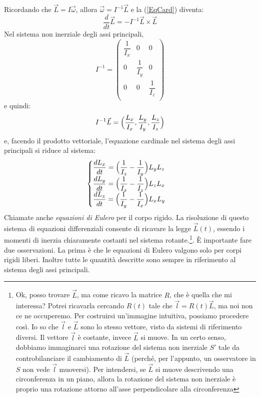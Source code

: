 \documentclass[a4paper,openany]{article}
\begin{document}
	
	Ricordando che $\vec{L} = I\vec{\omega}$, allora $\vec{\omega} = I^{-1}\vec{L}$ e la (\ref{EqCard}) diventa:
	\begin{equation}
		\dfrac{d}{dt}\vec{L} = -I^{-1}\vec{L}\times\vec{L}
		\label{EqCard}
	\end{equation}
	Nel sistema non inerziale degli assi principali,
	\begin{equation}\label{key}
		I^{-1} = 
		\begin{pmatrix}
			\dfrac{1}{I_{x}} & 0 & 0 \\
			0 & \dfrac{1}{I_y} & 0 \\
			0 & 0 & \dfrac{1}{I_z} \\
		\end{pmatrix}
	\end{equation}
	e quindi:
	\begin{equation}\label{key}
		I^{-1}\vec{L} = \Bigl(\dfrac{L_x}{I_x},\dfrac{L_y}{I_y},\dfrac{L_z}{I_z}\Bigl)
	\end{equation}
	e, facendo il prodotto vettoriale, l'equazione cardinale nel sistema degli assi principali si riduce al sistema:
	\begin{equation}
		\begin{cases}
			\dfrac{dL_x}{dt} = \Bigl(\dfrac{1}{I_z}-\dfrac{1}{I_y}\Bigl) L_yL_z \\
			\dfrac{dL_y}{dt} = \Bigl(\dfrac{1}{I_x}-\dfrac{1}{I_z}\Bigl) L_zL_x \\
			\dfrac{dL_z}{dt} = \Bigl(\dfrac{1}{I_y}-\dfrac{1}{I_x}\Bigl) L_xL_y
		\end{cases}
		\label{EqEulero}
	\end{equation}
	Chiamate anche \textit{equazioni di Eulero} per il corpo rigido. La risoluzione di questo sistema di equazioni differenziali consente di ricavare la legge $\vec{L}(t)$, essendo i momenti di inerzia chiaramente costanti nel sistema rotante.\footnote{Ok, posso trovare $\vec{L}$, ma come ricavo la matrice $R$, che è quella che mi interessa? Potrei ricavarla cercando $R(t)$ tale che $\vec{l} = R(t)\vec{L}$, ma noi non ce ne occuperemo. Per costruirsi un'immagine intuitiva, possiamo procedere così. Io so che $\vec{l}$ e $\vec{L}$ sono lo stesso vettore, visto da sistemi di riferimento diversi. Il vettore $\vec{l}$ è costante, invece $\vec{L}$ si muove. In un certo senso, dobbiamo immaginarci una rotazione del sistema non inerziale $S'$ tale da controbilanciare il cambiamento di $\vec{L}$ (perché, per l'appunto, un osservatore in $S$ non vede $\vec{l}$ muoversi). Per intendersi, se $\vec{L}$ si muove descrivendo una circonferenza in un piano, allora la rotazione del sistema non inerziale è proprio una rotazione attorno all'asse perpendicolare alla circonferenza}. È importante fare due osservazioni. La prima è che le equazioni di Eulero valgono solo per corpi rigidi liberi. Inoltre tutte le quantità descritte sono sempre in riferimento al sistema degli assi principali.
\end{document}
